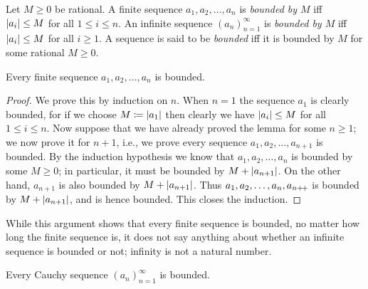 \begin{defn}\label{5.1.12}
  Let \(M \geq 0\) be rational.
  A finite sequence \(a_1, a_2, \dots, a_n\) is \emph{bounded by \(M\)} iff \(\left\lvert a_i\right\rvert \leq M\) for all \(1 \leq i \leq n\).
  An infinite sequence \((a_n)_{n = 1}^{\infty}\) is \emph{bounded by \(M\)} iff \(\left\lvert a_i\right\rvert \leq M\) for all \(i \geq 1\).
  A sequence is said to be \emph{bounded} iff it is bounded by \(M\) for some rational \(M \geq 0\).
\end{defn}

\setcounter{thm}{13}
\begin{lem}\label{5.1.14}
  Every finite sequence \(a_1, a_2, \dots, a_n\) is bounded.
\end{lem}

\begin{proof}
  We prove this by induction on \(n\).
  When \(n = 1\) the sequence \(a_1\) is clearly bounded, for if we choose \(M \coloneqq \left\lvert a_1\right\rvert\) then clearly we have \(\left\lvert a_i\right\rvert \leq M\) for all \(1 \leq i \leq n\).
  Now suppose that we have already proved the lemma for some \(n \geq 1\);
  we now prove it for \(n + 1\), i.e., we prove every sequence \(a_1, a_2, \dots, a_{n + 1}\) is bounded.
  By the induction hypothesis we know that \(a_1, a_2, \dots, a_n\) is bounded by some \(M \geq 0\);
  in particular, it must be bounded by \(M + \left\lvert a_{n + 1}\right\rvert\).
  On the other hand, \(a_{n + 1}\) is also bounded by \(M + \left\lvert a_{n + 1}\right\rvert\).
  Thus \(a_1, a_2, \dots, a_n, a_{n{+}\!{+}}\) is bounded by \(M + \left\lvert a_{n + 1}\right\rvert\), and is hence bounded.
  This closes the induction.
\end{proof}

\begin{note}
  While this argument shows that every finite sequence is bounded, no matter how long the finite sequence is, it does not say anything about whether an infinite sequence is bounded or not;
  infinity is not a natural number.
\end{note}

\begin{lem}\label{5.1.15}
  Every Cauchy sequence \((a_n)_{n = 1}^{\infty}\) is bounded.
\end{lem}

